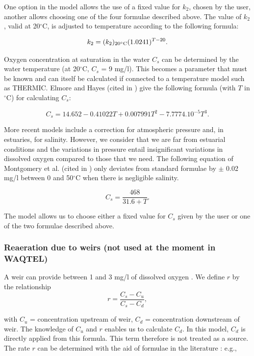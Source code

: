 One option in the model allows the use of a fixed value for $k_2$, chosen by the user,
another allows choosing one of the four formulae described above.
The value of $k_2$, valid at 20$^{\circ}$C, is adjusted to temperature according to the following formula:

\begin{equation}
  k_2 = (k_2)_{20^{\circ}\rm{C}} (1.0241)^{T-20}.
\end{equation}

Oxygen concentration at saturation in the water $C_s$ can be determined
by the water temperature (at 20$^{\circ}$C, $C_s$ = 9 mg/l).
This becomes a parameter that must be known and can itself be calculated
if connected to a temperature model such as THERMIC.
Elmore and Hayes (cited in \cite{mccutcheon_wq_1989}) give the following formula
(with $T$ in $^{\circ}$C) for calculating $C_s$:

\begin{equation}
  C_s = 14.652 - 0.41022 T + 0.007991 T^2 - 7.7774.10^{-5}T^3.
\end{equation}

More recent models include a correction for atmospheric pressure and, in estuaries, for salinity.
However, we consider that we are far from estuarial conditions and the variations in pressure
entail insignificant variations in dissolved oxygen compared to those that we need.
The following equation of Montgomery et al. (cited in \cite{mccutcheon_wq_1989})
only deviates from standard formulae by $ \pm $  0.02 mg/l
between 0 and 50$^{\circ}$C when there is negligible salinity.

\begin{equation}
  C_s = \frac{468}{31.6+T}.
\end{equation}

The model allows us to choose either a fixed value for $C_s$ given
by the user or one of the two formulae described above.\\

\subsubsection{Reaeration due to weirs (not used at the moment in WAQTEL)}

A weir can provide between 1 and 3 mg/l of dissolved oxygen \cite{mccutcheon_wq_1989}.
We define $r$ by the relationship $$r = \frac{C_s-C_u}{C_s-C_d},$$

with $C_u$ = concentration upstream of weir, $C_d$ = concentration downstream of weir.
The knowledge of $C_u$ and $r$  enables us to calculate $C_d$.
In this model, $C_d$ is directly applied from this formula.
This term therefore is not treated as a source.
The rate $r$ can be determined with the aid of formulae in the literature
\cite{mccutcheon_wq_1989}: e.g.,

